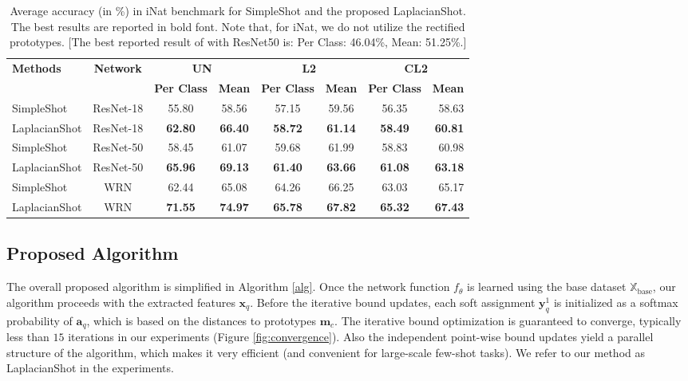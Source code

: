 \documentclass{article}
\newcommand{\yy}{{\mathbf y}}
\newcommand{\ftheta}{f_{\theta}}
\newcommand{\xxq}{\mathbf{x}}
\newcommand{\XXb}{\mathbb{X}_{\text{base}}}
\newcommand{\mm}{{\mathbf m}}
\begin{document}
\begin{table*}[tb]
\caption{Average accuracy (in \%) in iNat benchmark for SimpleShot \cite{wang2019simpleshot} and the proposed LaplacianShot. The best results are reported in bold font. Note that, for iNat, we do not utilize the rectified prototypes. [The best reported result of \cite{wertheimer2019few} with ResNet50 is: Per Class: 46.04\%, Mean: 51.25\%.]}
\label{tab:iNat}
\vskip 0.1in
\begin{center}
\begin{small}
\begin{tabular}{lccccccr}
\toprule
\multirow{2}{*}{\textbf{Methods}} & \multirow{2}{*}{\textbf{Network}} & \multicolumn{2}{c}{\textbf{UN}}& \multicolumn{2}{c}{\textbf{L2}}&\multicolumn{2}{c}{\textbf{CL2}}\\
&&\textbf{Per Class}&\textbf{Mean}&\textbf{Per Class}&\textbf{Mean}&\textbf{Per Class}&\textbf{Mean}\\
\midrule
SimpleShot & ResNet-18 &55.80&58.56&57.15& 59.56 & 56.35& 58.63\\
\rowcolor{Gray}
LaplacianShot & ResNet-18 &\textbf{62.80}&\textbf{66.40}&\textbf{58.72}&\textbf{61.14}&\textbf{58.49}&\textbf{60.81}\\
\hline
SimpleShot & ResNet-50 &58.45&61.07&59.68&61.99&58.83&60.98\\
\rowcolor{Gray}
LaplacianShot & ResNet-50 &\textbf{65.96}&\textbf{69.13}&\textbf{61.40}&\textbf{63.66}&\textbf{61.08}&\textbf{63.18}\\
\hline
SimpleShot & WRN &62.44&65.08&64.26&66.25&63.03&65.17\\
\rowcolor{Gray}
LaplacianShot &WRN &\textbf{71.55} & \textbf{74.97}& \textbf{65.78}& \textbf{67.82}&\textbf{65.32} &\textbf{67.43}\\
\bottomrule
\end{tabular}
\end{small}
\end{center}
\vskip -0.1in
\end{table*}
\subsection{Proposed Algorithm}
The overall proposed algorithm is simplified in Algorithm \ref{alg}. Once the network function $\ftheta$ is learned using the base dataset $\XXb$, our algorithm proceeds with the extracted features $\xxq_q$. Before the iterative bound updates, each 
soft assignment $\yy_q^1$ is initialized as a softmax probability of $\mathbf{a}_q$, which is based on the distances to prototypes $\mm_c$. The iterative bound optimization is guaranteed to converge, typically less than $15$ iterations in our experiments (Figure \ref{fig:convergence}). Also the independent point-wise bound updates yield a parallel structure of the algorithm, which makes it very efficient (and convenient for large-scale few-shot tasks). We refer to our method as 
LaplacianShot in the experiments.
\end{document}
